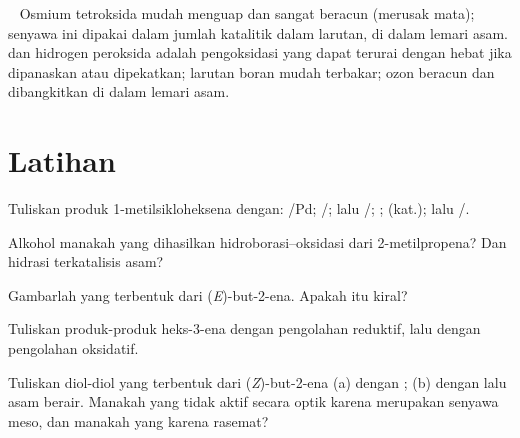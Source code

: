 \begin{safety}{\,\,\,}
Osmium tetroksida mudah menguap dan sangat beracun (merusak mata); senyawa
ini dipakai dalam jumlah katalitik dalam larutan, di dalam lemari asam.  dan hidrogen peroksida adalah pengoksidasi yang dapat terurai dengan
hebat jika dipanaskan atau dipekatkan; larutan boran mudah terbakar; ozon
beracun dan dibangkitkan di dalam lemari asam.
\end{safety}

\section{Latihan}

\begin{exercise}[$\star$]\label{exo:b2:alkene-redox:1}
Tuliskan produk 1-metilsikloheksena dengan: /Pd; /;
 lalu /; ;  (kat.);  lalu
/.
\end{exercise}

\begin{exercise}[$\star$]\label{exo:b2:alkene-redox:2}
Alkohol manakah yang dihasilkan hidroborasi--oksidasi dari 2-metilpropena?
Dan hidrasi terkatalisis asam?
\end{exercise}

\begin{exercise}[$\star$]\label{exo:b2:alkene-redox:3}
Gambarlah  yang terbentuk dari (\textit{E})-but-2-ena. Apakah  itu kiral?
\end{exercise}

\begin{exercise}[$\star$]\label{exo:b2:alkene-redox:4}
Tuliskan produk-produk  heks-3-ena dengan pengolahan reduktif,
lalu dengan pengolahan oksidatif.
\end{exercise}

\begin{exercise}[$\star\star$]\label{exo:b2:alkene-redox:5}
Tuliskan diol-diol yang terbentuk dari (\textit{Z})-but-2-ena (a) dengan
; (b) dengan  lalu asam berair. Manakah yang tidak
aktif secara optik karena merupakan senyawa meso, dan manakah yang karena
rasemat?
\end{exercise}

